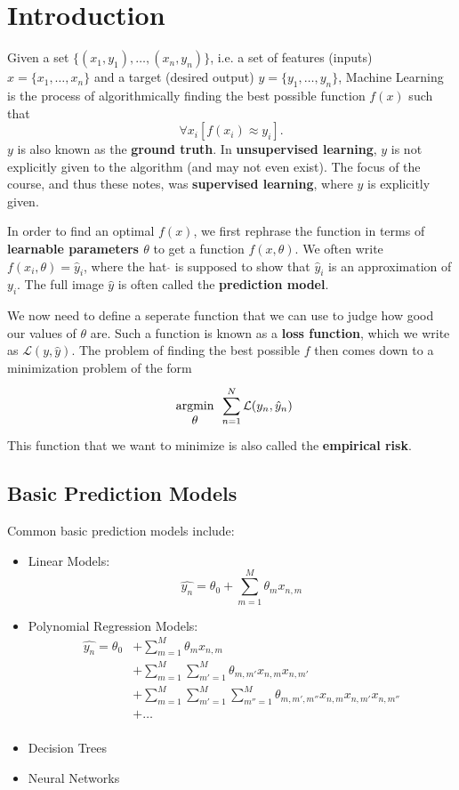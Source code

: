 \documentclass{report}
\newcommand{\tbf}{\textbf}
\newcommand{\argmin}[1] {
    \begin{array}{c}
        \vphantom{#1}\\ %
        \text{argmin}\\
        #1\\
        \end{array}
    }
\newcommand*{\newpar}{\par\vspace{\baselineskip}\noindent}
\begin{document}

\tableofcontents
\thispagestyle{fancy}
\chapter{Introduction}
Given a set $\{(x_1,y_1), \hdots, (x_n,y_n)\}$, i.e. a set of features (inputs) $x = \{x_1, \hdots, x_n\}$ and a target (desired output) $y = \{y_1, \hdots, y_n\}$, Machine Learning is the process of algorithmically finding the best possible function $f(x)$ such that
\begin{equation*}
 \forall x_i[f(x_i) \approx y_i].
\end{equation*}
$y$ is also known as the \tbf{ground truth}.
In \tbf{unsupervised learning}, $y$ is not explicitly given to the algorithm (and may not even exist). The focus of the course, and thus these notes, was \tbf{supervised learning}, where $y$ is explicitly given.
\newpar
In order to find an optimal $f(x)$, we first rephrase the function in terms of \tbf{learnable parameters $\theta$} to get a function $f(x,\theta)$. We often write $f(x_i, \theta) = \hat{y}_i$, where the hat $\hat{}$ is supposed to show that $\hat{y}_i$ is an approximation of $y_i$. The full image $\hat{y}$ is often called the \tbf{prediction model}.
\newpar
We now need to define a seperate function that we can use to judge how good our values of $\theta$ are. Such a function is known as a \tbf{loss function}, which we write as $\mathcal{L}(y, \hat{y})$. The problem of finding the best possible $f$ then comes down to a minimization problem of the form
\begin{equation*}
\argmin{\theta} \sum_{n=1}^N \mathcal{L}(y_n, \hat{y}_n)
\end{equation*}
This function that we want to minimize is also called the \tbf{empirical risk}.
\newpar
\section{Basic Prediction Models}
Common basic prediction models include:
\begin{itemize}
 \item Linear Models:
 \begin{equation*}
 \hat{y_n} = \theta_0 + \sum_{m=1}^M \theta_m x_{n,m} 
 \end{equation*}
 \item Polynomial Regression Models:
 \begin{align*}
 \hat{y_n} = \theta_0 &+ \sum_{m=1}^M \theta_m x_{n,m}\\
           &+ \sum_{m=1}^M \sum_{m'=1}^M \theta_{m,m'} x_{n,m} x_{n,m'}\\
           &+ \sum_{m=1}^M \sum_{m'=1}^M \sum_{m''=1}^M \theta_{m,m',m''} x_{n,m} x_{n,m'} x_{n,m''}\\
           &+ \hdots\\
 \end{align*}
 \item Decision Trees
 \item Neural Networks
\end{itemize}
%
\end{document}
